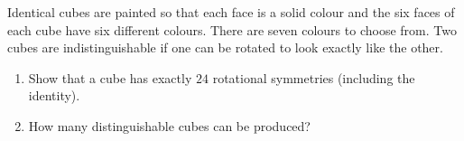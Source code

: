 Identical cubes are painted so that each face is a solid colour and the six faces of each cube have six different colours. There are seven colours to choose from. Two cubes are indistinguishable if one can be rotated to look exactly like the other.
\begin{enumerate}
\item[(a)] Show that a cube has exactly $24$ rotational symmetries (including the identity).
\item[(b)] How many distinguishable cubes can be produced?
\end{enumerate}

